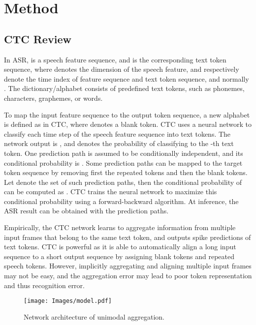 \documentclass{article}
\begin{document}
 \section{Method}
\label{sec:method}

\subsection{CTC Review}
\label{sec:ctc}

In ASR,  is a speech feature sequence, and  is the corresponding text token sequence, where  denotes the dimension of the speech feature,  and  respectively denote the time index of feature sequence and text token sequence, and normally . The dictionary/alphabet  consists of  predefined text tokens, such as phonemes, characters, graphemes, or words. 

To map the input feature sequence to the output token sequence, a new alphabet is defined as  in CTC, where  denotes a blank token. CTC uses a neural network to classify each time step of the speech feature sequence into text tokens. The network output is , and  denotes the probability of classifying  to the -th text token. One prediction path  is assumed to be conditionally independent, and its conditional probability is .  Some prediction paths can be mapped to the target token sequence  by removing first the repeated tokens and then the blank tokens. Let  denote the set of such prediction paths, then the conditional probability of  can be computed as . CTC trains the neural network to maximize this conditional probability using a forward-backward algorithm. At inference, the ASR result can be obtained with the prediction paths. 

Empirically, the CTC network learns to aggregate information from multiple input frames that belong to the same text token, and outputs spike predictions of text tokens. CTC is powerful as it is able to automatically align a long input sequence to a short output sequence by assigning blank tokens and repeated speech tokens. However, implicitly aggregating and aligning multiple input frames may not be easy, and the aggregation error may lead to poor token representation and thus recognition error. 

\begin{figure}[tb]
\centering
\centerline{\texttt{[image: Images/model.pdf]}}
\caption{Network architecture of unimodal aggregation.}
\label{fig:nn}
\vspace{-0.4cm}
\end{figure}
\end{document}
